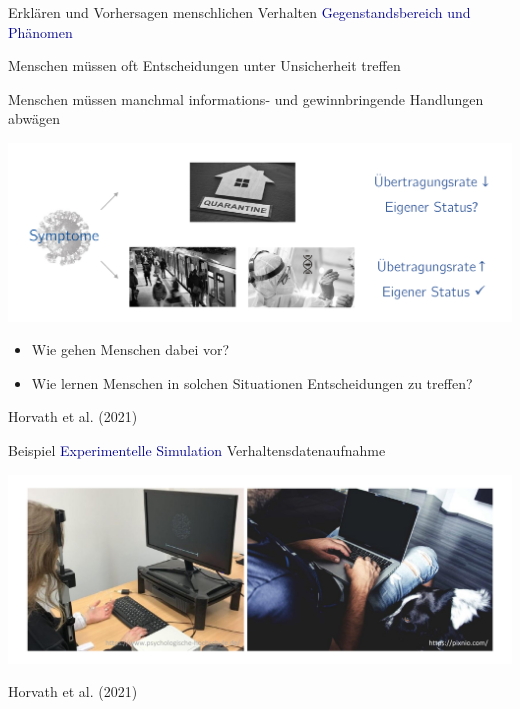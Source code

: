 \documentclass[
  8pt,
  ignorenonframetext,
]{beamer}
\begin{document}
\begin{frame}{Erklären und Vorhersagen menschlichen Verhalten}
\protect\hypertarget{erkluxe4ren-und-vorhersagen-menschlichen-verhalten}{}
\textcolor{darkblue}{Gegenstandsbereich und Phänomen}


Menschen müssen oft Entscheidungen unter Unsicherheit treffen

Menschen müssen manchmal informations- und gewinnbringende Handlungen
abwägen

\begin{center}\includegraphics[width=0.8\linewidth]{2_Abbildungen/pfm_2_horvath_gegenstandsbereich} \end{center}

\begin{itemize}
\item
  Wie gehen Menschen dabei vor?
\item
  Wie lernen Menschen in solchen Situationen Entscheidungen zu treffen?
\end{itemize}

\flushright
\footnotesize

Horvath et al. (2021)
\end{frame}

\begin{frame}{Beispiel}
\protect\hypertarget{beispiel}{}
\textcolor{darkblue}{Experimentelle Simulation} \vfill
Verhaltensdatenaufnahme

\begin{center}\includegraphics[width=1\linewidth]{2_Abbildungen/pfm_2_verhaltensdatenaufnahme} \end{center}
\vfill

\flushright
\footnotesize

Horvath et al. (2021)
\end{frame}
\end{document}
